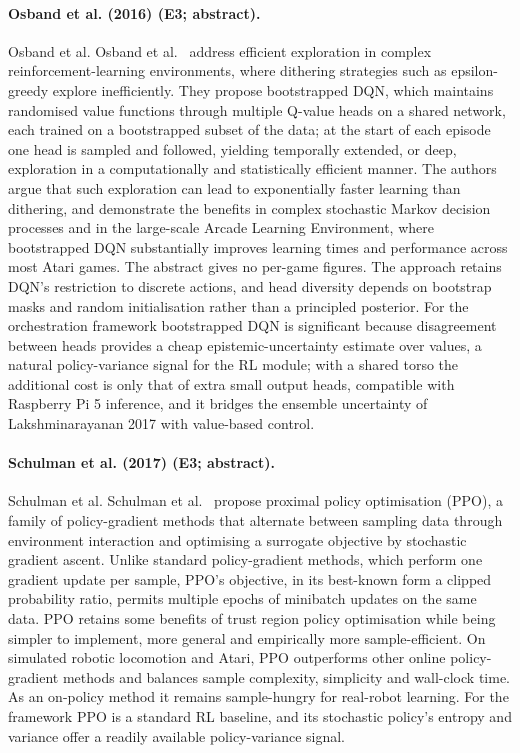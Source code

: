 \documentclass[10pt,a4paper]{article}
\begin{document}
\paragraph{Osband et al. (2016) (E3; abstract).} Osband et al. Osband et al.~\cite{Osband2016} address efficient exploration in complex reinforcement-learning environments, where dithering strategies such as epsilon-greedy explore inefficiently. They propose bootstrapped DQN, which maintains randomised value functions through multiple Q-value heads on a shared network, each trained on a bootstrapped subset of the data; at the start of each episode one head is sampled and followed, yielding temporally extended, or deep, exploration in a computationally and statistically efficient manner. The authors argue that such exploration can lead to exponentially faster learning than dithering, and demonstrate the benefits in complex stochastic Markov decision processes and in the large-scale Arcade Learning Environment, where bootstrapped DQN substantially improves learning times and performance across most Atari games. The abstract gives no per-game figures. The approach retains DQN's restriction to discrete actions, and head diversity depends on bootstrap masks and random initialisation rather than a principled posterior. For the orchestration framework bootstrapped DQN is significant because disagreement between heads provides a cheap epistemic-uncertainty estimate over values, a natural policy-variance signal for the RL module; with a shared torso the additional cost is only that of extra small output heads, compatible with Raspberry Pi 5 inference, and it bridges the ensemble uncertainty of Lakshminarayanan 2017 with value-based control.

\paragraph{Schulman et al. (2017) (E3; abstract).} Schulman et al. Schulman et al.~\cite{Schulman2017} propose proximal policy optimisation (PPO), a family of policy-gradient methods that alternate between sampling data through environment interaction and optimising a surrogate objective by stochastic gradient ascent. Unlike standard policy-gradient methods, which perform one gradient update per sample, PPO's objective, in its best-known form a clipped probability ratio, permits multiple epochs of minibatch updates on the same data. PPO retains some benefits of trust region policy optimisation while being simpler to implement, more general and empirically more sample-efficient. On simulated robotic locomotion and Atari, PPO outperforms other online policy-gradient methods and balances sample complexity, simplicity and wall-clock time. As an on-policy method it remains sample-hungry for real-robot learning. For the framework PPO is a standard RL baseline, and its stochastic policy's entropy and variance offer a readily available policy-variance signal.
\end{document}
